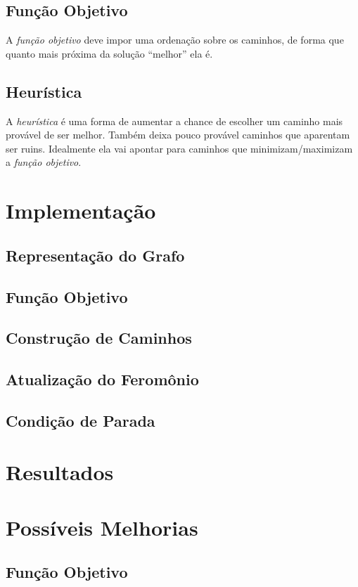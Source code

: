 \documentclass{article}
\begin{document}
\subsection{Função Objetivo}
A \emph{função objetivo} deve impor
uma ordenação sobre os caminhos,
de forma que quanto mais próxima da solução
``melhor'' ela é.

\subsection{Heurística}
A \emph{heurística} é uma forma de aumentar a chance de escolher
um caminho mais provável de ser melhor.
Também deixa pouco provável
caminhos que aparentam ser ruins.
Idealmente ela vai apontar para caminhos que
minimizam/maximizam a \emph{função objetivo}.

\section{Implementação}
\subsection{Representação do Grafo}
\subsection{Função Objetivo}
\subsection{Construção de Caminhos}
\subsection{Atualização do Feromônio}
\subsection{Condição de Parada}

\section{Resultados}

\section{Possíveis Melhorias}
\subsection{Função Objetivo}
\end{document}
